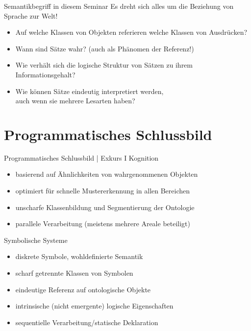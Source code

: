 \begin{frame}
  {Semantikbegriff in diesem Seminar}
  \onslide<+->
  \onslide<+->
  Es dreht sich alles um die Beziehung von Sprache zur Welt!\\
  \Zeile
  \begin{itemize}[<+->]
    \item Auf welche Klassen von Objekten \alert{referieren} welche Klassen von Ausdrücken?
    \item Wann sind Sätze wahr? (auch als Phänomen der \alert{Referenz}!)
    \item Wie verhält sich die logische Struktur von Sätzen zu ihrem Informationsgehalt?
    \item Wie können Sätze eindeutig interpretiert werden,\\
      auch wenn sie mehrere Lesarten haben?
  \end{itemize}
\end{frame}

\section{Programmatisches Schlussbild}

\begin{frame}
  {Programmatisches Schlussbild | Exkurs I}
  \onslide<+->
  \onslide<+->
  \alert{Kognition}\\
  \Viertelzeile
  \begin{itemize}[<+->]
    \item basierend auf Ähnlichkeiten von wahrgenommenen Objekten
    \item optimiert für schnelle Mustererkennung \alert{in allen Bereichen}
    \item unscharfe Klassenbildung und Segmentierung der Ontologie
    \item parallele Verarbeitung (meistens mehrere Areale beteiligt)
  \end{itemize}
  \Halbzeile 
  \onslide<+->
  \alert{Symbolische Systeme}\\
  \Viertelzeile
  \begin{itemize}[<+->]
    \item diskrete Symbole, wohldefinierte Semantik
    \item scharf getrennte Klassen von Symbolen
    \item eindeutige Referenz auf ontologische Objekte
    \item intrinsische (nicht emergente) logische Eigenschaften\\
    \item sequentielle Verarbeitung\slash statische Deklaration\\
  \end{itemize}
\end{frame}

